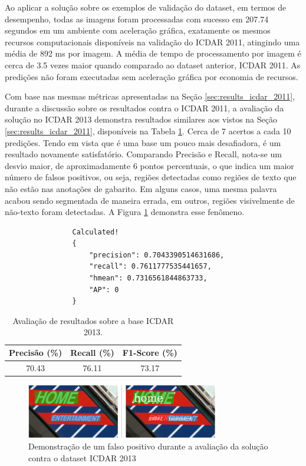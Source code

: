 Ao aplicar a solução sobre os exemplos de validação do dataset, em termos de desempenho, todas as imagens foram processadas com sucesso em 207.74 segundos em um ambiente com aceleração gráfica, exatamente os mesmos recursos computacionais disponíveis na validação do ICDAR 2011, atingindo uma média de 892 ms por imagem. A média de tempo de processamento por imagem é cerca de 3.5 vezes maior quando comparado ao dataset anterior, ICDAR 2011.  As predições não foram executadas sem aceleração gráfica por economia de recursos.

Com base nas mesmas métricas apresentadas na Seção \ref{sec:results_icdar_2011}, durante a discussão sobre os resultados contra o ICDAR 2011, a avaliação da solução no ICDAR 2013 demonstra resultados similares aos vistos na Seção \ref{sec:results_icdar_2011}, disponíveis na Tabela \ref{tab:icdar13_results}. Cerca de 7 acertos a cada 10 predições. Tendo em vista que é uma base um pouco mais desafiadora, é um resultado novamente satisfatório. Comparando Precisão e Recall, nota-se um desvio maior, de aproximadamente 6 pontos percentuais, o que indica um maior número de falsos positivos, ou seja, regiões detectadas como regiões de texto que não estão nas anotações de gabarito. Em alguns casos, uma mesma palavra acabou sendo segmentada de maneira errada, em outros, regiões visivelmente de não-texto foram detectadas. A Figura \ref{fig:results_icdar13_01} demonstra esse fenômeno.


\begin{verbatim}
                Calculated!
                {
                    "precision": 0.7043390514631686,
                    "recall": 0.7611777535441657,
                    "hmean": 0.7316561844863733, 
                    "AP": 0
                }
\end{verbatim}

\begin{table}[htb]
    \centering
    \caption{Avaliação de resultados sobre a base ICDAR 2013.}
    \begin{tabular}{|c|c|c|}
        \hline
        Precisão (\%) & Recall (\%) & F1-Score (\%) \\
        \hline
        70.43 & 76.11 & 73.17\\
        \hline
    \end{tabular}
    \label{tab:icdar13_results}
\end{table}

\begin{figure}
    \centering
    \includegraphics[width=0.75\textwidth]{figs/resultados-icdar13-01.png}
    \caption{Demonstração de um falso positivo durante a avaliação da solução contra o dataset ICDAR 2013}
    \label{fig:results_icdar13_01}
\end{figure}

